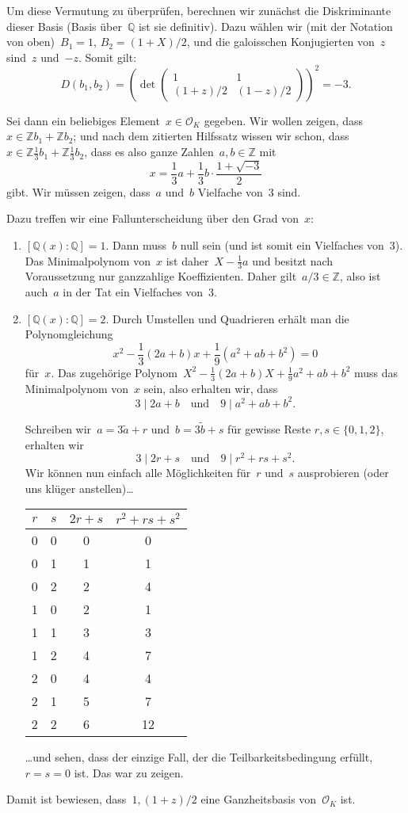 \documentclass[12pt,a4paper,ngerman]{scrartcl}
\newcommand{\Q}{\mathbb{Q}}
\newcommand{\Z}{\mathbb{Z}}
\theoremstyle{definition}
\theoremstyle{plain}
\theoremstyle{remark}
\begin{document}
Um diese Vermutung zu überprüfen, berechnen wir zunächst die Diskriminante
dieser Basis (Basis über~$\Q$ ist sie definitiv). Dazu wählen wir (mit der
Notation von oben)~$B_1 = 1$, $B_2 = (1+X)/2$, und die galoisschen Konjugierten
von~$z$ sind~$z$ und~$-z$. Somit gilt:
\[ D(b_1,b_2) = \left(\operatorname{det} \begin{pmatrix}
  1 & 1 \\
  (1+z)/2 & (1-z)/2
\end{pmatrix}\right)^2 = -3. \]

Sei dann ein beliebiges Element~$x \in \mathcal{O}_K$ gegeben. Wir wollen
zeigen, dass~$x \in \Z b_1 + \Z b_2$; und nach dem zitierten Hilfssatz wissen
wir schon, dass~$x \in \Z \frac{1}{3} b_1 + \Z \frac{1}{3} b_2$, dass es also
ganze Zahlen~$a,b \in \Z$ mit
\[ x = \frac{1}{3}a + \frac{1}{3}b \cdot \frac{1+\sqrt{-3}}{2} \]
gibt. Wir müssen zeigen, dass~$a$ und~$b$ Vielfache von~$3$ sind.

Dazu treffen wir eine Fallunterscheidung über den Grad von~$x$:
\begin{enumerate}
\item $[\Q(x):\Q] = 1$. Dann muss~$b$ null sein (und ist somit ein Vielfaches
von~3). Das Minimalpolynom von~$x$ ist daher~$X - \frac{1}{3}a$ und besitzt
nach Voraussetzung nur ganzzahlige Koeffizienten. Daher gilt~$a/3 \in \Z$, also
ist auch~$a$ in der Tat ein Vielfaches von~$3$.
\item $[\Q(x):\Q] = 2$. Durch Umstellen und Quadrieren erhält man die
Polynomgleichung
\[ x^2 - \frac{1}{3}(2a+b) x + \frac{1}{9}(a^2+ab+b^2) = 0 \]
für~$x$. Das zugehörige Polynom~$X^2 - \frac{1}{3}(2a+b)X +
\frac{1}{9}{a^2+ab+b^2}$ muss das Minimalpolynom von~$x$ sein, also erhalten
wir, dass
\[ 3 \mathrel{|} 2a+b \quad\text{und}\quad 9 \mathrel{|} a^2+ab+b^2. \]

Schreiben wir~$a = 3\tilde a + r$ und~$b = 3\tilde b + s$ für gewisse Reste
$r,s \in \{ 0,1,2 \}$, erhalten wir
\[ 3 \mathrel{|} 2r+s \quad\text{und}\quad 9 \mathrel{|} r^2+rs+s^2. \]
Wir können nun einfach alle Möglichkeiten für~$r$ und~$s$ ausprobieren (oder
uns klüger anstellen)\ldots
\begin{center}
\begin{tabular}{cccc}
  $r$ & $s$ & $2r+s$ & $r^2+rs+s^2$ \\
  \hline
  0 & 0 & 0 & 0 \\
  0 & 1 & 1 & 1 \\
  0 & 2 & 2 & 4 \\
  1 & 0 & 2 & 1 \\
  1 & 1 & 3 & 3 \\
  1 & 2 & 4 & 7 \\
  2 & 0 & 4 & 4 \\
  2 & 1 & 5 & 7 \\
  2 & 2 & 6 & 12
\end{tabular}
\end{center}
\ldots und sehen, dass der einzige Fall, der die Teilbarkeitsbedingung erfüllt,
$r = s = 0$ ist. Das war zu zeigen.
\end{enumerate}
Damit ist bewiesen, dass~$1, (1+z)/2$ eine Ganzheitsbasis von~$\mathcal{O}_K$
ist.
\end{document}
